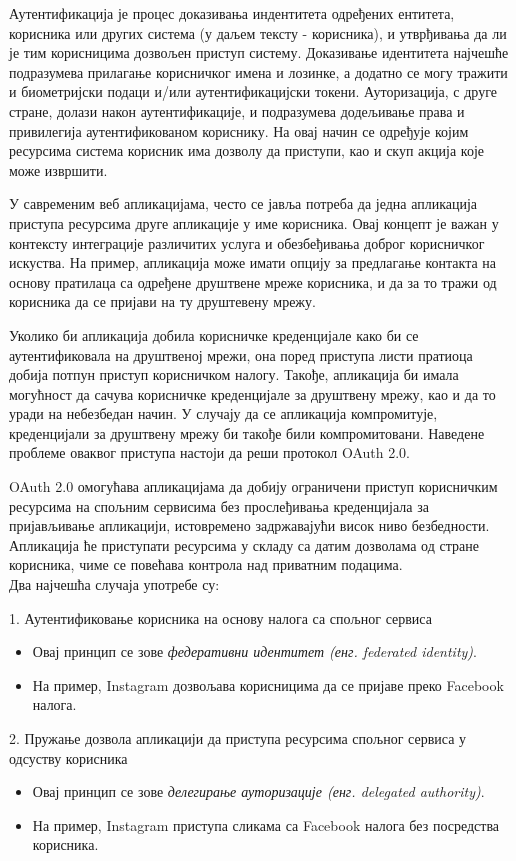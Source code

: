 \documentclass[12pt,oneside]{memoir}
\begin{document}
Аутентификација је процес доказивања индентитета одређених ентитета, корисника или других система (у даљем тексту - корисника), и утврђивања да ли је тим корисницима дозвољен приступ систему. Доказивање идентитета најчешће подразумева прилагање корисничког имена и лозинке, а додатно се могу тражити и биометријски подаци и/или аутентификацијски токени.
Ауторизација, с друге стране, долази након аутентификације, и подразумева додељивање права и привилегија аутентификованом кориснику. На овај начин се одређује којим ресурсима система корисник има дозволу да приступи, као и скуп акција које може извршити. 

У савременим веб апликацијама, често се јавља потреба да једна апликација приступа ресурсима друге апликације у име корисника. Овај концепт је важан у контексту интеграције различитих услуга и обезбеђивања доброг корисничког искуства. На пример, апликација може имати опцију за предлагање контакта на основу пратилаца са одређене друштвене мреже корисника, и да за то тражи од корисника да се пријави на ту друштевену мрежу.

Уколико би апликација добила корисничке креденцијале како би се аутентификовала на друштвеној мрежи, она поред приступа листи пратиоца
добија потпун приступ корисничком налогу. Такође, апликација би имала могућност да сачува корисничке креденцијале за друштвену мрежу, као и да то уради на небезбедан начин. У случају да се апликација компромитује, креденцијали за друштвену мрежу би такође били компромитовани. Наведене проблеме оваквог приступа настоји да реши протокол OAuth 2.0.

OAuth 2.0 омогућава апликацијама да добију ограничени приступ корисничким ресурсима на спољним сервисима без прослеђивања креденцијала за пријављивање апликацији, истовремено задржавајући висок ниво безбедности. Апликација ће приступати ресурсима у складу са датим дозволама од стране корисника, чиме се повећава контрола над приватним подацима. \\ 
Два најчешћа случаја употребе су:

1. Аутентификовање корисника на основу налога са спољног сервиса
\begin{itemize}[-]
    \item Овај принцип се зове \textit{федеративни идентитет (енг. federated identity)}. 
    \item На пример, Instagram дозвољава корисницима да се пријаве преко Fa\-ce\-book налога.
\end{itemize}

2. Пружање дозвола апликацији да приступа ресурсима спољног сервиса у одсуству корисника
\begin{itemize}[-]
    \item Овај принцип се зове \textit{делегирање ауторизације (енг. delegated authority)}. 
    \item На пример, Instagram приступа сликама са Facebook налога без посредства корисника.
\end{itemize}
\end{document}
